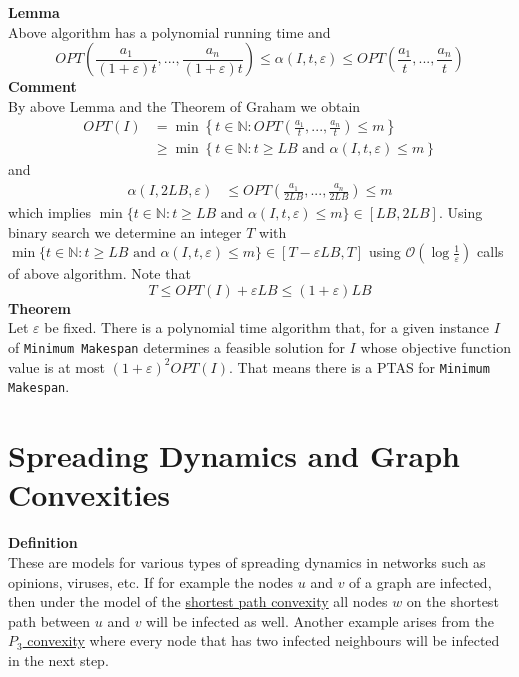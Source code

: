 \documentclass[a4paper, 12pt]{article}
\begin{document}
	\textbf{Lemma}\\
	Above algorithm has a polynomial running time and \[OPT\left(\frac{a_1}{(1+\varepsilon)t},...,\frac{a_n}{(1+\varepsilon)t}\right) \leq \alpha(I,t,\varepsilon) \leq OPT\left(\frac{a_1}{t},...,\frac{a_n}{t}\right)\]
	\textbf{Comment}\\
	By above Lemma and the Theorem of Graham we obtain \begin{align*}
		OPT(I) &= \min\left\{t \in \mathbb{N}: OPT\left(\frac{a_1}{t},...,\frac{a_n}{t}\right) \leq m\right\}\\
		& \geq \min\left\{t \in \mathbb{N}: t \geq LB \text{ and } \alpha(I,t,\varepsilon) \leq m\right\}
	\end{align*} and \begin{align*}
	\alpha(I, 2LB, \varepsilon) & \leq OPT\left(\frac{a_1}{2LB},...,\frac{a_n}{2LB}\right) \leq m
	\end{align*} which implies $\min\{t \in \mathbb{N}: t \geq LB \text{ and } \alpha(I,t,\varepsilon) \leq m\} \in [LB,2LB]$. Using binary search we determine an integer $T$ with $\min\{t \in \mathbb{N}: t \geq LB \text{ and } \alpha(I,t,\varepsilon) \leq m\} \in [T-\varepsilon LB, T]$ using $\mathcal{O}\left(\log \frac{1}{\varepsilon}\right)$ calls of above algorithm. Note that \[T \leq OPT(I)+\varepsilon LB \leq (1+\varepsilon) LB\]
	\textbf{Theorem}\\
	Let $\varepsilon$ be fixed. There is a polynomial time algorithm that, for a given instance $I$ of \texttt{Minimum Makespan} determines a feasible solution for $I$ whose objective function value is at most $(1+\varepsilon)^2OPT(I)$. That means there is a PTAS for \texttt{Minimum Makespan}.
	\section{Spreading Dynamics and Graph Convexities}
	\textbf{Definition}\\
	These are models for various types of spreading dynamics in networks such as opinions, viruses, etc. If for example the nodes $u$ and $v$ of a graph are infected, then under the model of the \underline{shortest path convexity} all nodes $w$ on the shortest path between $u$ and $v$ will be infected as well. Another example arises from the \underline{$P_3$ convexity} where every node that has two infected neighbours will be infected in the next step.
	
\end{document}

